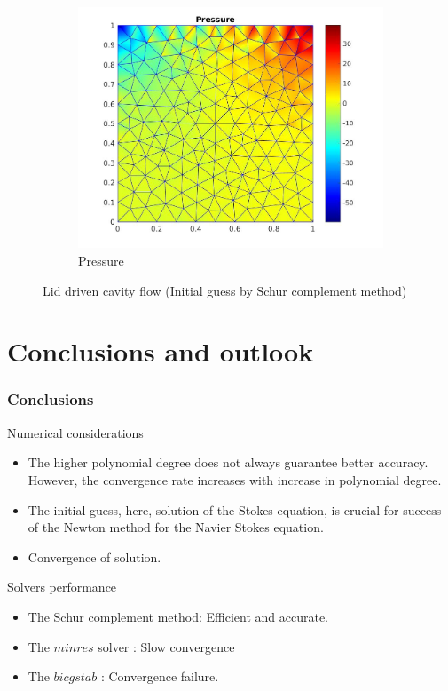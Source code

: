 \documentclass{beamer}
\begin{document}
\begin{frame}
\begin{figure}
\begin{subfigure}{0.3\textwidth}
    \includegraphics[width=\linewidth]{lid_newton_pressure_schur.jpg}
    \caption{Pressure}
  \label{pressure_navier_stoke_schur_lid}
  \end{subfigure}
\caption{Lid driven cavity flow (Initial guess by Schur complement method)}
\label{lid_driven_cavity_n_s_schur}
\end{figure}
\end{frame}
\section{Conclusions and outlook}
\begin{frame}
\frametitle{Conclusions}

\begin{block}{Numerical considerations}
\begin{itemize}
\item The higher polynomial degree does not always guarantee better accuracy. However, the convergence rate increases with increase in polynomial degree.
\item The initial guess, here, solution of the Stokes equation, is crucial for success of the Newton method for the Navier Stokes equation.
\item Convergence of solution.
\end{itemize}
\end{block}

\begin{block}{Solvers performance}
\begin{itemize}
\item The Schur complement method: Efficient and accurate.
\item The $minres$ solver : Slow convergence 
\item The $bicgstab$ : Convergence failure.
\end{itemize}
\end{block}

\end{frame}
\end{document}
